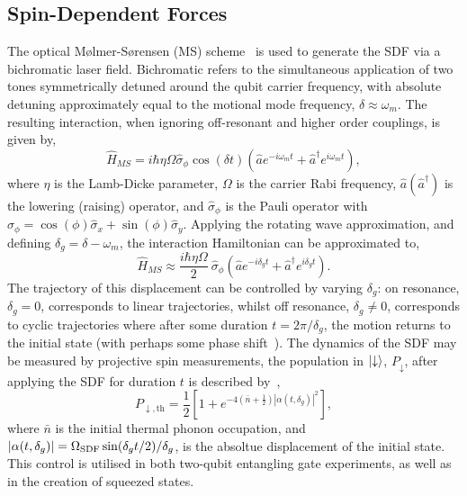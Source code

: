 \subsection{Spin-Dependent Forces}
\label{sec:Spin-Dependent Forces}
    The optical Mølmer-Sørensen (MS) scheme~\cite{sorensen2000entanglement} is used to generate the
    SDF via a bichromatic laser field. Bichromatic refers to the simultaneous
    application of two tones symmetrically detuned around the qubit carrier
    frequency, with absolute detuning approximately equal to the motional mode
    frequency, $\delta \approx \omega_{m}$. The resulting interaction, when
    ignoring off-resonant and higher order couplings, is given by,
    \begin{equation}
        \hat{H}_{MS} = i\hbar \eta\Omega\hat{\sigma}_\phi\cos(\delta t) \left( \hat{a} e^{-i\omega_{m} t} + \hat{a}^\dagger e^{i\omega_{m} t} \right),
    \end{equation}
    where $\eta$ is the Lamb-Dicke parameter, $\Omega$ is the carrier Rabi
    frequency, $\hat{a}(\hat{a}^\dagger)$ is the lowering (raising) operator, and
    $\hat{\sigma}_\phi$ is the Pauli operator with $\hat{\sigma}_\phi = \cos(\phi)\hat{\sigma}_x + \sin(\phi)\hat{\sigma}_y$.
    Applying the rotating wave approximation, and defining $\delta_g = \delta -
    \omega_{m}$, the interaction Hamiltonian can be approximated
    to,
    \begin{equation}
        \label{eqn:MS}
        \hat{H}_{MS} \approx \frac{i\hbar \eta\Omega}{2}~\hat{\sigma}_\phi \left( \hat{a} e^{-i\delta_g t} + \hat{a}^\dagger e^{i\delta_g t} \right).
    \end{equation}
    The trajectory of this displacement can be controlled by varying $\delta_g$: on
    resonance, $\delta_g = 0$, corresponds to linear trajectories, whilst off resonance,
    $\delta_g \neq 0$, corresponds to cyclic trajectories where after some duration $t =
    2\pi/\delta_g$, the motion returns to the initial state (with perhaps some phase shift~\cite{haljan2005spin-dependent}). 
    The dynamics of the SDF may be measured by projective spin measurements, the population in $\ket{\downarrow}$, $P_\downarrow$, after applying the SDF for duration $t$ is described by~\cite{burd2020squeezing},
    \begin{equation}
        \label{eqn:sdf_pop}
        P_{\downarrow,\mathrm{th}} = \frac{1}{2} \left[ 1 + e^{-4\left( \bar{n} + \frac{1}{2} \right) |\alpha(t, \delta_g)|^2} \right],
    \end{equation}
    where $\bar{n}$ is the initial thermal phonon occupation, and $|\alpha(t, \delta_g)| = \Omega_{\rm SDF} \sin(\delta_g t/2)/\delta_g$, is the absoltue displacement of the initial state.
    This control is utilised in both two-qubit entangling gate experiments, as well as
    in the creation of squeezed states.\\

